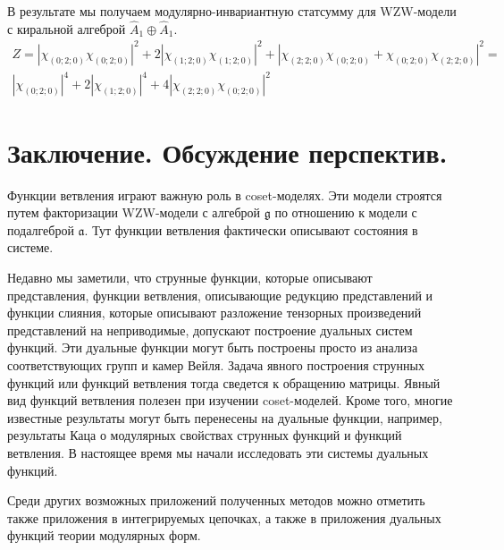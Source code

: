 \documentclass[a4paper,12pt]{article}
\theoremstyle{definition} \newtheorem{Def}{Definition}
\begin{document}
В результате мы получаем модулярно-инвариантную статсумму для WZW-модели с киральной алгеброй $\hat{A}_1\oplus \hat{A}_1$.
\begin{multline}
  \label{eq:40}
  Z=\left|\chi_{(0;2;0)}\chi_{(0;2;0)}\right|^2+2\left|\chi_{(1;2;0)}\chi_{(1;2;0)}\right|^2+ \left|\chi_{(2;2;0)}\chi_{(0;2;0)}+\chi_{(0;2;0)}\chi_{(2;2;0)}\right|^2=\\
  \left|\chi_{(0;2;0)}\right|^4+2\left|\chi_{(1;2;0)}\right|^4+ 4\left|\chi_{(2;2;0)}\chi_{(0;2;0)}\right|^2
\end{multline}

\section{Заключение. Обсуждение перспектив.}
\label{sec:conlusion}

Функции ветвления играют важную роль в coset-моделях. Эти модели строятся путем факторизации
WZW-модели с алгеброй $\mathfrak{g}$ по отношению к модели с подалгеброй $\mathfrak{a}$. Тут функции
ветвления фактически описывают состояния в системе.

Недавно мы заметили, что струнные функции, которые описывают представления, функции ветвления,
описывающие редукцию представлений и функции слияния, которые описывают разложение тензорных
произведений представлений на неприводимые, допускают построение дуальных систем функций. Эти
дуальные функции могут быть построены просто из анализа соответствующих групп и камер Вейля. 
Задача явного построения струнных функций или функций ветвления тогда сведется к обращению матрицы.
Явный вид функций ветвления полезен при изучении coset-моделей. Кроме того, многие
известные результаты могут быть перенесены на дуальные функции, например, результаты Каца о модулярных свойствах
струнных функций и функций ветвления.
В настоящее время мы начали исследовать эти системы дуальных функций. 

Среди других возможных приложений полученных методов можно отметить также приложения в интегрируемых
цепочках, а также в приложения дуальных функций теории модулярных форм. 
\end{document}
